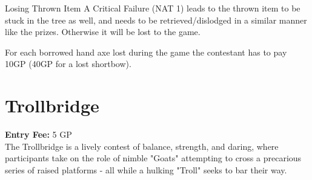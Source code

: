 \begin{DndOptionalRule}{Losing Thrown Item}
	A Critical Failure (NAT 1) leads to the thrown item to be stuck in the tree as well, and needs to be retrieved/dislodged in a similar manner like the prizes. Otherwise it will be lost to the game.
	
	For each borrowed hand axe lost during the game the contestant has to pay 10GP (40GP for a lost shortbow).
\end{DndOptionalRule}
\vfill\eject
\section*{Trollbridge}
\textbf{Entry Fee:} 5 GP\\
{\entryfont The Trollbridge is a lively contest of balance, strength, and daring, where participants take on the role of nimble "Goats" attempting to cross a precarious series of raised platforms - all while a hulking "Troll" seeks to bar their way.}
